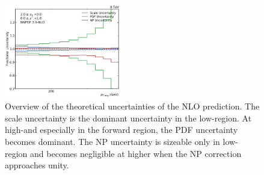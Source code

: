 \begin{figure}[htbp]
    \includegraphics[width=0.45\textwidth]{figures/theory/theo_unc_yb2ys0.pdf}
    \caption{Overview of the theoretical uncertainties of the NLO prediction.
    The scale uncertainty is the dominant uncertainty in the low-\pt region. At
high-\pt and especially in the forward region, the PDF uncertainty becomes
dominant. The NP uncertainty is sizeable only in low-\pt region and becomes
negligible at higher \pt when the NP correction approaches unity.}
    \label{fig:theo_uncertainties}
\end{figure}
